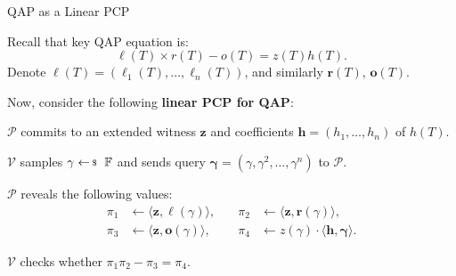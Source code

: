 \documentclass{zkdl-presentation-template}
\begin{document}
    \begin{frame}{QAP as a Linear PCP}
        \begin{example}
            Recall that key QAP equation is:
            \begin{equation*}
                \ell(T) \times r(T) - o(T) = z(T)h(T).
            \end{equation*}
            Denote $\boldsymbol{\ell}(T) = (\ell_1(T),\dots,\ell_n(T))$, and similarly $\boldsymbol{r}(T)$, $\boldsymbol{o}(T)$.
            \pause

            Now, consider the following \textbf{linear PCP for QAP}:
            \begin{algoen}
                \item $\mathcal{P}$ commits to an extended witness $\mathbf{z}$ and coefficients $\mathbf{h} = (h_1,\dots,h_n)$ of $h(T)$.\pause
                \item $\mathcal{V}$ samples $\gamma \leftarrowS \mathbb{F}$ and sends query $\boldsymbol{\gamma} = (\gamma,\gamma^2,\dots,\gamma^n)$ to $\mathcal{P}$.\pause
                \item $\mathcal{P}$ reveals the following values:
                \begin{align*}
                    \pi_1 &\gets \langle \mathbf{z}, \boldsymbol{\ell}(\gamma) \rangle, \quad &\pi_2 &\gets \langle \mathbf{z}, \boldsymbol{r}(\gamma) \rangle, \\
                    \pi_3 &\gets \langle \mathbf{z}, \boldsymbol{o}(\gamma) \rangle, \quad &\pi_4 &\gets z(\gamma) \cdot \langle \mathbf{h}, \boldsymbol{\gamma} \rangle.
                \end{align*}
                \vspace{-10pt}
                \pause
                \item $\mathcal{V}$ checks whether $\pi_1\pi_2 - \pi_3 = \pi_4$.
            \end{algoen}
        \end{example}
    \end{frame}
\end{document}
